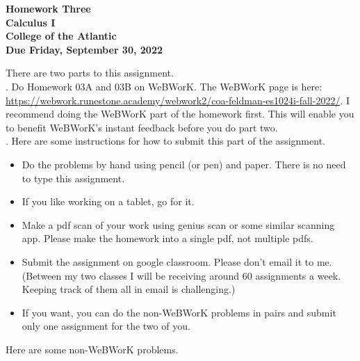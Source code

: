 \documentclass[12pt]{article}
\begin{document}
\pagestyle{empty}
 
\begin{center}
{\LARGE {\bf Homework Three}}\\
\bigskip
{\Large {\bf Calculus I}}\\
\bigskip
{\Large {\bf College of the Atlantic}}\\
\bigskip
{ {\bf Due Friday, September 30, 2022}}\\ 
\end{center}
\medskip


\noindent There are two parts to this assignment.\\

.  Do Homework 03A and 03B on WeBWorK.  The WeBWorK page is here:
\url{https://webwork.runestone.academy/webwork2/coa-feldman-es1024i-fall-2022/}.
I recommend doing the WeBWorK part of the homework first.  This will
enable you to benefit WeBWorK's instant feedback before you do part
two.\\ 


.  Here are some
instructions for how to submit this part of the assignment.
\begin{itemize}
  \setlength{\itemsep}{0mm}
\item Do the problems by hand using pencil (or pen) and paper.
  There is no need to type this assignment.
\item If you like working on a tablet, go for it. 
\item Make a pdf scan of your work using genius scan or some
  similar scanning app.  Please make the homework into a single
  pdf, not multiple pdfs.
\item Submit the assignment on google classroom.  Please don't
  email it to me.  (Between my two classes I will be receiving
  around 60 assignments a week.  Keeping track of them all in email 
  is challenging.)
\item If you want, you can do the non-WeBWorK problems in pairs and
  submit only one assignment for the two of you. \\
\end{itemize}

\noindent Here are some non-WeBWorK problems.
\end{document}
